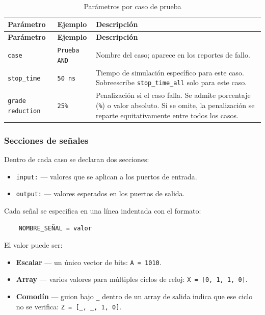 \documentclass[12pt, a4paper, twoside, openany]{book}
\begin{document}
\begin{longtable}{L{3.6cm} L{3.2cm} L{5.7cm}}
  \caption{Parámetros por caso de prueba}
  \label{tab:params-caso}\\
  \toprule
  \textbf{Parámetro} & \textbf{Ejemplo} & \textbf{Descripción} \\
  \midrule
  \endfirsthead
  \toprule
  \textbf{Parámetro} & \textbf{Ejemplo} & \textbf{Descripción} \\
  \midrule
  \endhead
  \bottomrule
  \endfoot
  \texttt{case} & \texttt{Prueba AND} &
    Nombre del caso; aparece en los reportes de fallo. \\
  \addlinespace
  \texttt{stop\_time} & \texttt{50 ns} &
    Tiempo de simulación específico para este caso.
    Sobreescribe \texttt{stop\_time\_all} solo para este caso. \\
  \addlinespace
  \texttt{grade reduction} & \texttt{25\%} &
    Penalización si el caso falla. Se admite porcentaje (\texttt{\%}) o
    valor absoluto. Si se omite, la penalización se reparte
    equitativamente entre todos los casos. \\
\end{longtable}

\subsubsection{Secciones de señales}

Dentro de cada caso se declaran dos secciones:

\begin{itemize}
  \item \texttt{input:} --- valores que se aplican a los puertos de entrada.
  \item \texttt{output:} --- valores esperados en los puertos de salida.
\end{itemize}

Cada señal se especifica en una línea indentada con el formato:

\begin{center}
  \texttt{~~~~NOMBRE\_SEÑAL = valor}
\end{center}

El valor puede ser:

\begin{itemize}
  \item \textbf{Escalar} --- un único vector de bits: \texttt{A = 1010}.
  \item \textbf{Array} --- varios valores para múltiples ciclos de reloj:
        \texttt{X = [0, 1, 1, 0]}.
  \item \textbf{Comodín} --- guion bajo \texttt{\_} dentro de un array de
        salida indica que ese ciclo no se verifica:
        \texttt{Z = [\_, \_, 1, 0]}.
\end{itemize}
\end{document}
